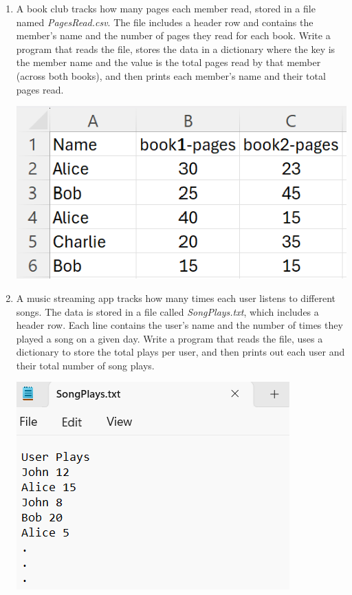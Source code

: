 \documentclass{article}
\begin{document}
\begin{enumerate}
	\item 
		A book club tracks how many pages each member read, stored in a file named 
		\textit{PagesRead.csv}. The file includes a header row and contains the member's 
		name and the number of pages they read for each book.  
		Write a program that reads the file, stores the data in a dictionary where the key is 
		the member name and the value is the total pages read by that member (across both books), 
		and then prints each member's name and their total pages read.
		
		\begin{flushright}
			\includegraphics[scale=.65]{imgs/PagesReadData.PNG}
		\end{flushright}


	\item 
		A music streaming app tracks how many times each user listens to different songs.  
		The data is stored in a file called \textit{SongPlays.txt}, which includes a header row.  
		Each line contains the user’s name and the number of times they played a song on a given day.  
		Write a program that reads the file, uses a dictionary to store the total plays per user, 
		and then prints out each user and their total number of song plays.
		
		\begin{flushright}
			\includegraphics[scale=.65]{imgs/SongPlaysData.PNG}
		\end{flushright}




\end{enumerate}
\end{document}
